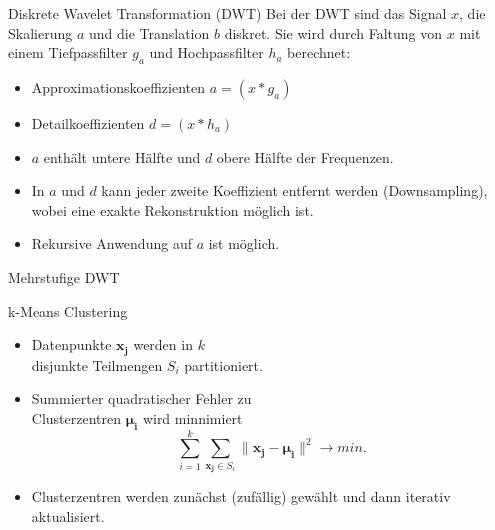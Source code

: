 \documentclass[aspectratio=169, 12pt]{beamer}
\begin{document}
\begin{frame}{Diskrete Wavelet Transformation (DWT)}
  Bei der DWT sind das Signal $x$, die Skalierung $a$ und die Translation $b$ diskret.
  Sie wird durch Faltung von $x$ mit einem Tiefpassfilter $g_a$ und Hochpassfilter $h_a$ berechnet:
  \begin{itemize}
    \item Approximationskoeffizienten $a = \left(x*g_a\right)$
    \item Detailkoeffizienten $d = \left(x*h_a\right)$
    \item $a$ enthält untere Hälfte und $d$ obere Hälfte der Frequenzen.
    \item In $a$ und $d$ kann jeder zweite Koeffizient entfernt werden (Downsampling), wobei eine exakte Rekonstruktion möglich ist.
    \item Rekursive Anwendung auf $a$ ist möglich.
  \end{itemize}
\end{frame}

\begin{frame}{Mehrstufige DWT}
  \begin{center}
  \end{center}
\end{frame}

\begin{frame}{k-Means Clustering}
  \begin{figure}
    \vspace{-1.5cm}
  \end{figure}
  \leavevmode
  \vspace{-1.0cm}
  \begin{itemize}
    \item Datenpunkte $\symbf{x_j}$ werden in $k$ \\ disjunkte Teilmengen $S_i$ partitioniert.
    \item Summierter quadratischer Fehler zu \\ Clusterzentren $\symbf{\mu_i}$ wird minnimiert
          \begin{equation*}
            \sum_{i=1}^{k} \sum_{\symbf{x_j} \in S_i} \lVert \symbf{x_j} - \symbf{\mu_i} \rVert^2 \rightarrow min.
          \end{equation*}
    \item Clusterzentren werden zunächst (zufällig) gewählt und dann iterativ aktualisiert.
  \end{itemize}
\end{frame}
\end{document}
